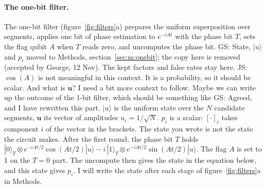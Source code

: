 \documentclass[11pt,a4paper]{article}
\newcommand{\js}[1]{{\color{blue} JS: #1 }}
\newcommand{\gs}[1]{{\color{orange!85!black} GS: #1 }}
\begin{document}
\paragraph{The one-bit filter.}
The one-bit filter (figure~\ref{fig:filters}a) prepares the uniform superposition over segments,
applies one bit of phase estimation to $e^{-iAt}$ with the phase bit $T$, sets the flag qubit $A$ when
$T$ reads zero, and uncomputes the phase bit. \gs{State, $|u\rangle$ and $p_i$ moved to Methods, section~\mbox{\ref{sec:m:onebit}}; the copy here is removed (accepted by George, 12 Nov). The kept factors and false rates stay here.}  \js{$\cos(A)$ is not meaningful in this context. It is a probability, so it should be scalar. And what is $\mathbf{u}$? I need a bit more context to follow. Maybe we can write up the outcome of the 1-bit filter, which should be something like } \gs{Agreed, and I have rewritten this part. $|u\rangle$ is the uniform state over the $N$ candidate segments, $\mathbf{u}$ its vector of amplitudes $u_i=1/\sqrt N$. $p_i$ is a scalar: $[\cdot]_i$ takes component $i$ of the vector in the brackets. The state you wrote is not the state the circuit makes. After the first round, the phase bit $T$ holds $|0\rangle_T\otimes e^{-iAt/2}\cos(At/2)|u\rangle-i\,|1\rangle_T\otimes e^{-iAt/2}\sin(At/2)|u\rangle$. The flag $A$ is set to 1 on the $T=0$ part. The uncompute then gives the state in the equation below, and this state gives $p_i$. I will write the state after each stage of figure~\ref{fig:filters}a in Methods.}
\end{document}
